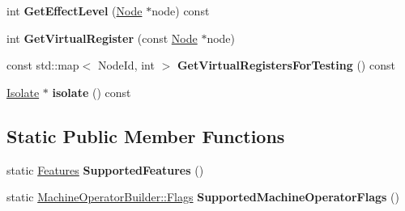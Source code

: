 \begin{DoxyCompactItemize}
\item 
int {\bfseries Get\+Effect\+Level} (\hyperlink{classv8_1_1internal_1_1compiler_1_1_node}{Node} $\ast$node) const \hypertarget{classv8_1_1internal_1_1compiler_1_1_instruction_selector_a2a64171e7fdbc0c6d03e0d775f06435e}{}\label{classv8_1_1internal_1_1compiler_1_1_instruction_selector_a2a64171e7fdbc0c6d03e0d775f06435e}

\item 
int {\bfseries Get\+Virtual\+Register} (const \hyperlink{classv8_1_1internal_1_1compiler_1_1_node}{Node} $\ast$node)\hypertarget{classv8_1_1internal_1_1compiler_1_1_instruction_selector_a5a599297960fde3d5fba06701f7ad932}{}\label{classv8_1_1internal_1_1compiler_1_1_instruction_selector_a5a599297960fde3d5fba06701f7ad932}

\item 
const std\+::map$<$ Node\+Id, int $>$ {\bfseries Get\+Virtual\+Registers\+For\+Testing} () const \hypertarget{classv8_1_1internal_1_1compiler_1_1_instruction_selector_a666193a151f509f67ad192c3b9c83a32}{}\label{classv8_1_1internal_1_1compiler_1_1_instruction_selector_a666193a151f509f67ad192c3b9c83a32}

\item 
\hyperlink{classv8_1_1internal_1_1_isolate}{Isolate} $\ast$ {\bfseries isolate} () const \hypertarget{classv8_1_1internal_1_1compiler_1_1_instruction_selector_ad8c797fe17565197fabb6ca21eb06899}{}\label{classv8_1_1internal_1_1compiler_1_1_instruction_selector_ad8c797fe17565197fabb6ca21eb06899}

\end{DoxyCompactItemize}
\subsection*{Static Public Member Functions}
\begin{DoxyCompactItemize}
\item 
static \hyperlink{classv8_1_1internal_1_1compiler_1_1_instruction_selector_1_1_features}{Features} {\bfseries Supported\+Features} ()\hypertarget{classv8_1_1internal_1_1compiler_1_1_instruction_selector_ab5ee2fe198b50a28b6e9d03cf26b79cb}{}\label{classv8_1_1internal_1_1compiler_1_1_instruction_selector_ab5ee2fe198b50a28b6e9d03cf26b79cb}

\item 
static \hyperlink{classv8_1_1base_1_1_flags}{Machine\+Operator\+Builder\+::\+Flags} {\bfseries Supported\+Machine\+Operator\+Flags} ()\hypertarget{classv8_1_1internal_1_1compiler_1_1_instruction_selector_aa31dee7be3b35a108712f2913a598ca0}{}\label{classv8_1_1internal_1_1compiler_1_1_instruction_selector_aa31dee7be3b35a108712f2913a598ca0}

\end{DoxyCompactItemize}
